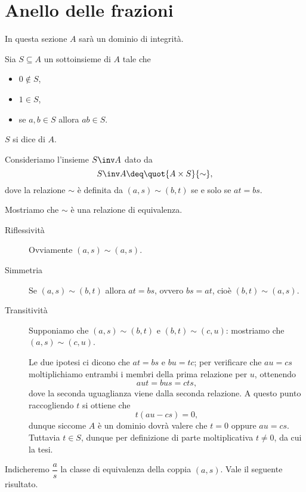 \section{Anello delle frazioni}

In questa sezione $A$ sarà un dominio di integrità.

\begin{definition}
     Sia $S \subseteq A$ un sottoinsieme di $A$ tale che \begin{itemize}
        \item $0 \notin S$,
        \item $1 \in S$,
        \item se $a, b \in S$ allora $ab \in S$.
    \end{itemize}
    $S$ si dice  di $A$.
\end{definition}

Consideriamo l'insieme $S\inv A$ dato da \[
    S\inv A \deq \quot{A \times S}{\sim},    
\] dove la relazione $\sim$ è definita da $(a, s) \sim (b, t)$ se e solo se $at = bs$.

Mostriamo che $\sim$ è una relazione di equivalenza.
\begin{description}
    \item[Riflessività] Ovviamente $(a, s) \sim (a, s)$.
    \item[Simmetria] Se $(a, s) \sim (b, t)$ allora $at = bs$, ovvero $bs = at$, cioè $(b, t) \sim (a, s)$.
    \item[Transitività] Supponiamo che $(a, s) \sim (b, t)$ e $(b, t) \sim (c, u)$: mostriamo che $(a, s) \sim (c, u)$.
    
    Le due ipotesi ci dicono che $at = bs$ e $bu = tc$; per verificare che $au = cs$ moltiplichiamo entrambi i membri della prima relazione per $u$, ottenendo \[
        aut = bus = cts,
    \] dove la seconda uguaglianza viene dalla seconda relazione. A questo punto raccogliendo $t$ si ottiene che \[
        t(au - cs) = 0,    
    \] dunque siccome $A$ è un dominio dovrà valere che $t = 0$ oppure $au = cs$. Tuttavia $t \in S$, dunque per definizione di parte moltiplicativa $t \neq 0$, da cui la tesi.
\end{description}

Indicheremo $\dfrac{a}{s}$ la classe di equivalenza della coppia $(a, s)$. Vale il seguente risultato.

